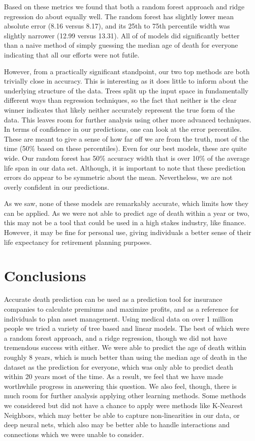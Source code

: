 \documentclass[letterpaper, 10 pt, conference]{ieeeconf}  %
\begin{document}
Based on these metrics we found that both a random forest approach and ridge regression do about equally well. The random forest has slightly lower mean absolute error (8.16 versus 8.17), and its 25th to 75th percentile width was slightly narrower (12.99 versus 13.31). All of of models did significantly better than a naive method of simply guessing the median age of death for everyone indicating that all our efforts were not futile. 

However, from a practically significant standpoint, our two top methods are both trivially close in accuracy. This is interesting as it does little to inform about the underlying structure of the data. Trees split up the input space in fundamentally different ways than regression techniques, so the fact that neither is the clear winner indicates that likely neither accurately represent the true form of the data. This leaves room for further analysis using other more advanced techniques. In terms of confidence in our predictions, one can look at the error percentiles. These are meant to give a sense of how far off we are from the truth, most of the time (50\% based on these percentiles). Even for our best models, these are quite wide. Our random forest has 50\% accuracy width that is over 10\% of the average life span in our data set. Although, it is important to note that these prediction errors do appear to be symmetric about the mean. Nevertheless, we are not overly confident in our predictions.

As we saw, none of these models are remarkably accurate, which limits how they can be applied. As we were not able to predict age of death within a year or two, this may not be a tool that could be used in a high stakes industry, like finance. However, it may be fine for personal use, giving individuals a better sense of their life expectancy for retirement planning purposes. 

\section{Conclusions}
Accurate death prediction can be used as a prediction tool for insurance companies to calculate premiums and maximize profits, and as a reference for individuals to plan asset management. Using medical data on over 1 million people we tried a variety of tree based and linear models. The best of which were a random forest approach, and a ridge regression, though we did not have tremendous success with either. We were able to predict the age of death within roughly 8 years, which is much better than using the median age of death in the dataset as the prediction for everyone, which was only able to predict death within 20 years most of the time. As a result, we feel that we have made worthwhile progress in answering this question. We also feel, though, there is much room for further analysis applying other learning methods. Some methods we considered but did not have a chance to apply were methods like K-Nearest Neighbors, which may better be able to capture non-linearities in our data, or deep neural nets, which also may be better able to handle interactions and connections which we were unable to consider. 
\end{document}

